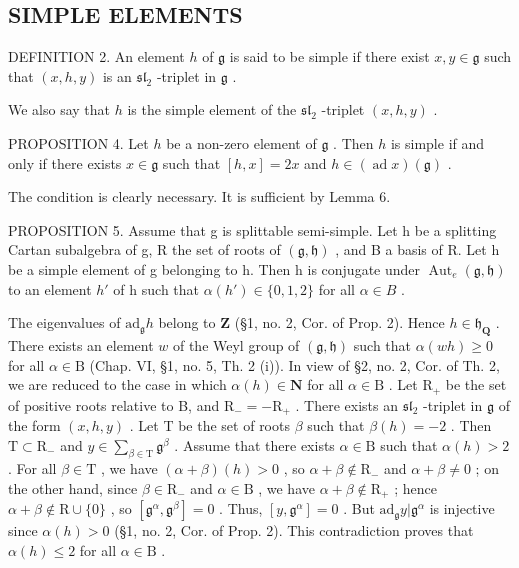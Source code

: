 \subsection{SIMPLE ELEMENTS}

DEFINITION 2. An element \(h\) of \(\mathfrak{g}\) is said to be simple if there exist \(x, y \in \mathfrak{g}\) such that \((x, h, y)\) is an \(\mathfrak{sl}_2\) -triplet in \(\mathfrak{g}\) .

We also say that \(h\) is the simple element of the \(\mathfrak{sl}_2\) -triplet \((x, h, y)\) .

PROPOSITION 4. Let \(h\) be a non-zero element of \(\mathfrak{g}\) . Then \(h\) is simple if and only if there exists \(x \in \mathfrak{g}\) such that \([h, x] = 2x\) and \(h \in (\operatorname{ad} x)(\mathfrak{g})\) .

The condition is clearly necessary. It is sufficient by Lemma 6.

PROPOSITION 5. Assume that g is splittable semi-simple. Let h be a splitting Cartan subalgebra of g, R the set of roots of \((\mathfrak{g},\mathfrak{h})\) , and B a basis of R. Let h be a simple element of g belonging to h. Then h is conjugate under \(\operatorname{Aut}_{e}(\mathfrak{g},\mathfrak{h})\) to an element \(h'\) of h such that \(\alpha(h') \in \{0,1,2\}\) for all \(\alpha \in B\) .

The eigenvalues of \(\mathrm{ad}_{\mathfrak{g}}h\) belong to \(\mathbf{Z}\) (§1, no. 2, Cor. of Prop. 2). Hence \(h \in \mathfrak{h}_{\mathbf{Q}}\) . There exists an element \(w\) of the Weyl group of \((\mathfrak{g}, \mathfrak{h})\) such that \(\alpha(wh) \geq 0\) for all \(\alpha \in \mathrm{B}\) (Chap. VI, §1, no. 5, Th. 2 (i)). In view of §2, no. 2, Cor. of Th. 2, we are reduced to the case in which \(\alpha(h) \in \mathbf{N}\) for all \(\alpha \in \mathrm{B}\) . Let \(\mathrm{R}_{+}\) be the set of positive roots relative to B, and \(\mathrm{R}_{-} = -\mathrm{R}_{+}\) . There exists an \(\mathfrak{sl}_2\) -triplet in \(\mathfrak{g}\) of the form \((x, h, y)\) . Let T be the set of roots \(\beta\) such that \(\beta(h) = -2\) . Then \(\mathrm{T} \subset \mathrm{R}_{-}\) and \(y \in \sum_{\beta \in \mathrm{T}} \mathfrak{g}^{\beta}\) . Assume that there exists \(\alpha \in \mathrm{B}\) such that \(\alpha(h) > 2\) . For all \(\beta \in \mathrm{T}\) , we have \((\alpha + \beta)(h) > 0\) , so \(\alpha + \beta \notin \mathrm{R}_{-}\) and \(\alpha + \beta \neq 0\) ; on the other hand, since \(\beta \in \mathrm{R}_{-}\) and \(\alpha \in \mathrm{B}\) , we have \(\alpha + \beta \notin \mathrm{R}_{+}\) ; hence \(\alpha + \beta \notin \mathrm{R} \cup \{0\}\) , so \([\mathfrak{g}^{\alpha}, \mathfrak{g}^{\beta}] = 0\) . Thus, \([y, \mathfrak{g}^{\alpha}] = 0\) . But \(\mathrm{ad}_{\mathfrak{g}}y|\mathfrak{g}^{\alpha}\) is injective since \(\alpha(h) > 0\) (§1, no. 2, Cor. of Prop. 2). This contradiction proves that \(\alpha(h) \leq 2\) for all \(\alpha \in \mathrm{B}\) .

